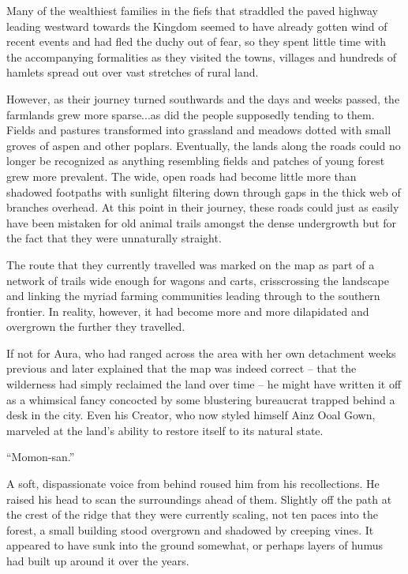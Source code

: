  

Many of the wealthiest families in the fiefs that straddled the paved highway leading westward towards the Kingdom seemed to have already gotten wind of recent events and had fled the duchy out of fear, so they spent little time with the accompanying formalities as they visited the towns, villages and hundreds of hamlets spread out over vast stretches of rural land.

 

However, as their journey turned southwards and the days and weeks passed, the farmlands grew more sparse...as did the people supposedly tending to them. Fields and pastures transformed into grassland and meadows dotted with small groves of aspen and other poplars. Eventually, the lands along the roads could no longer be recognized as anything resembling fields and patches of young forest grew more prevalent. The wide, open roads had become little more than shadowed footpaths with sunlight filtering down through gaps in the thick web of branches overhead. At this point in their journey, these roads could just as easily have been mistaken for old animal trails amongst the dense undergrowth but for the fact that they were unnaturally straight.

 

The route that they currently travelled was marked on the map as part of a network of trails wide enough for wagons and carts, crisscrossing the landscape and linking the myriad farming communities leading through to the southern frontier. In reality, however, it had become more and more dilapidated and overgrown the further they travelled.

 

If not for Aura, who had ranged across the area with her own detachment weeks previous and later explained that the map was indeed correct – that the wilderness had simply reclaimed the land over time – he might have written it off as a whimsical fancy concocted by some blustering bureaucrat trapped behind a desk in the city. Even his Creator, who now styled himself Ainz Ooal Gown, marveled at the land's ability to restore itself to its natural state.

 

“Momon-san.”

 

A soft, dispassionate voice from behind roused him from his recollections. He raised his head to scan the surroundings ahead of them. Slightly off the path at the crest of the ridge that they were currently scaling, not ten paces into the forest, a small building stood overgrown and shadowed by creeping vines. It appeared to have sunk into the ground somewhat, or perhaps layers of humus had built up around it over the years.

